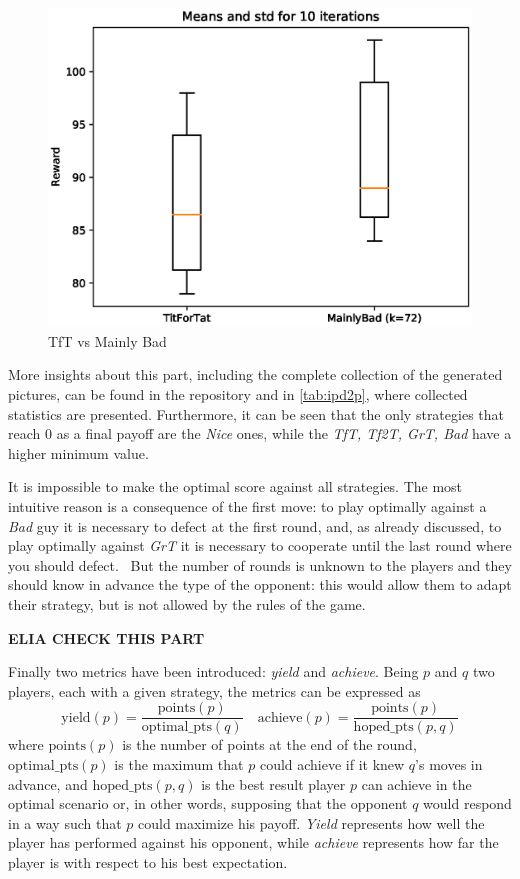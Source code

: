 \documentclass[journal,a4paper,10pt,twoside]{IEEEtran} %
\begin{document}
\begin{figure}[!ht]
    \centering
    \includegraphics[width=1\columnwidth]{../img/ipd2p/ipd2p-boxplot-TitForTat-MainlyBad(k=72)}
    \caption{TfT vs Mainly Bad}
    \label{fig:boxmbvtft}
\end{figure}

More insights about this part, including the complete collection of the generated pictures, can be found in the repository and in \autoref{tab:ipd2p}, where collected statistics are presented.
Furthermore, it can be seen that the only strategies that reach $0$ as a final payoff are the \textit{Nice} ones, while the \textit{TfT, Tf2T, GrT, Bad} have a higher minimum value.

It is impossible to make the optimal score against all strategies. The most intuitive reason is a consequence of the first move: to play optimally against a \textit{Bad} guy it is necessary to defect at the first round, and, as already discussed, to play optimally against \textit{GrT} it is necessary to cooperate until the last round where you should defect.~\cite{mathieu2017}
But the number of rounds is unknown to the players and they should know in advance the type of the opponent: this would allow them to adapt their strategy, but is not allowed by the rules of the game. 

\textbf{ELIA CHECK THIS PART}

Finally two metrics have been introduced: \textit{yield} and \textit{achieve}. 
Being $p$ and $q$ two players, each with a given strategy, the metrics can be expressed as
$$
\mathrm{yield}(p) = \frac{\mathrm{points}(p)}{\mathrm{optimal\_pts}(q)} \quad
\mathrm{achieve}(p) = \frac{\mathrm{points}(p)}{\mathrm{hoped\_pts}(p,q)}
$$
where $\mathrm{points}(p)$ is the number of points at the end of the round,
$\mathrm{optimal\_pts}(p)$ is the maximum that $p$ could achieve if it knew $q$'s moves in advance, and
$\mathrm{hoped\_pts}(p,q)$ is the best result player $p$ can achieve in the optimal scenario or, in other words, supposing that the opponent $q$ would respond in a way such that $p$ could maximize his payoff.
\textit{Yield} represents how well the player has performed against his opponent, while \textit{achieve} represents how far the player is with respect to his best expectation.
\end{document}
